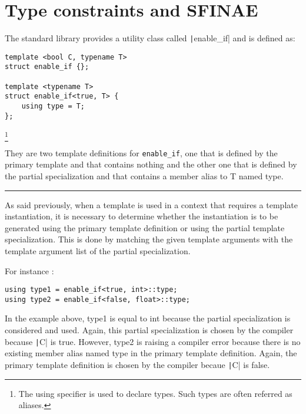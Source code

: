 \section*{Type constraints and SFINAE}

The standard library provides a utility class called \texttt|enable_if| and is defined as:

\begin{paracol}{2}
\begin{verbatim}
template <bool C, typename T>
struct enable_if {};

template <typename T>
struct enable_if<true, T> {
    using type = T;
};
\end{verbatim}
\footnote{The using specifier is used to declare types. Such types are often referred as aliases.}

\switchcolumn

\vspace{20pt}
They are two template definitions for \texttt{enable_if}, one that is defined by the primary template and that contains nothing and the other one that is defined by the partial specialization and that contains a member alias to T named type.

\end{paracol}

\vspace{10pt}
\hrule
\vspace{10pt}

As said previously, when a template is used in a context that requires a template instantiation, it is necessary to determine whether the instantiation is to be generated using the primary template definition or using the partial template specialization. This is done by matching the given template arguments with the template argument list of the partial specialization.

\vspace{10pt}

For instance :
\begin{verbatim}
using type1 = enable_if<true, int>::type;
using type2 = enable_if<false, float>::type;
\end{verbatim}

In the example above, type1 is equal to int because the partial specialization is considered and used. Again, this partial specialization is chosen by the compiler because \texttt|C| is true. However, type2 is raising a compiler error because there is no existing member alias named type in the primary template definition. Again, the primary template definition is chosen by the compiler becaue \texttt|C| is false.

